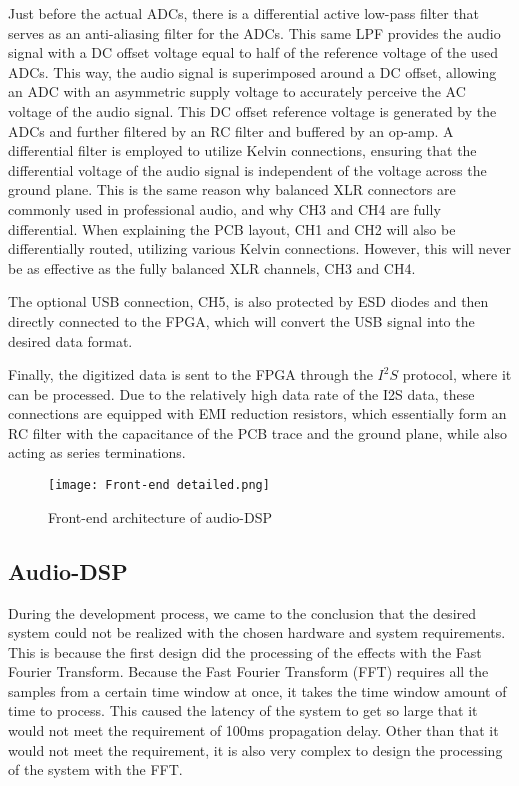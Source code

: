 Just before the actual ADCs, there is a differential active low-pass filter that serves as an anti-aliasing filter for the ADCs. This same LPF provides the audio signal with a DC offset voltage equal to half of the reference voltage of the used ADCs. This way, the audio signal is superimposed around a DC offset, allowing an ADC with an asymmetric supply voltage to accurately perceive the AC voltage of the audio signal. This DC offset reference voltage is generated by the ADCs and further filtered by an RC filter and buffered by an op-amp. A differential filter is employed to utilize Kelvin connections, ensuring that the differential voltage of the audio signal is independent of the voltage across the ground plane. This is the same reason why balanced XLR connectors are commonly used in professional audio, and why CH3 and CH4 are fully differential. When explaining the PCB layout, CH1 and CH2 will also be differentially routed, utilizing various Kelvin connections. However, this will never be as effective as the fully balanced XLR channels, CH3 and CH4.

The optional USB connection, CH5, is also protected by ESD diodes and then directly connected to the FPGA, which will convert the USB signal into the desired data format.

Finally, the digitized data is sent to the FPGA through the $I^2S$ protocol, where it can be processed. Due to the relatively high data rate of the I2S data, these connections are equipped with EMI reduction resistors, which essentially form an RC filter with the capacitance of the PCB trace and the ground plane, while also acting as series terminations.

\begin{figure}[ht]
    \texttt{[image: Front-end detailed.png]}\\    
    \caption{Front-end architecture of audio-DSP}
    \label{fig:arch-front-end}
\end{figure}

\subsection{Audio-DSP}
During the development process, we came to the conclusion that the desired system could not be realized with the chosen hardware and system requirements. This is because the first design did the processing of the effects with the Fast Fourier Transform. Because the Fast Fourier Transform (FFT) requires all the samples from a certain time window at once, it takes the time window amount of time to process. This caused the latency of the system to get so large that it would not meet the requirement of 100ms propagation delay. Other than that it would not meet the requirement, it is also very complex to design the processing of the system with the FFT.

